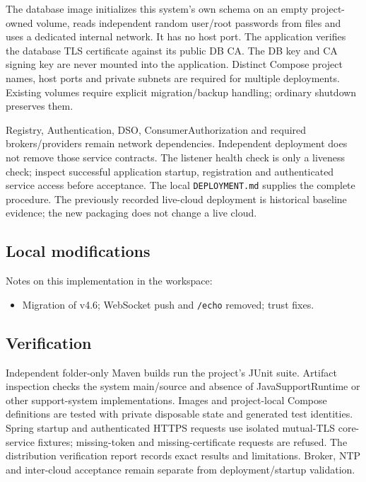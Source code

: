 \documentclass[a4paper]{arrowhead}
\begin{document}
The database image initializes this system's own schema on an empty project-owned volume, reads independent random user/root passwords from files and uses a dedicated internal network. It has no host port. The application verifies the database TLS certificate against its public DB CA. The DB key and CA signing key are never mounted into the application. Distinct Compose project names, host ports and private subnets are required for multiple deployments. Existing volumes require explicit migration/backup handling; ordinary shutdown preserves them.

Registry, Authentication, DSO, ConsumerAuthorization and required brokers/providers remain network dependencies. Independent deployment does not remove those service contracts. The listener health check is only a liveness check; inspect successful application startup, registration and authenticated service access before acceptance. The local \texttt{DEPLOYMENT.md} supplies the complete procedure. The previously recorded live-cloud deployment is historical baseline evidence; the new packaging does not change a live cloud.

\subsection{Local modifications}
\label{sec:local}

Notes on this implementation in the workspace:
\begin{itemize}
  \item Migration of v4.6; WebSocket push and \texttt{/\allowbreak{}echo} removed; trust fixes.
\end{itemize}

\subsection{Verification}

Independent folder-only Maven builds run the project's JUnit suite. Artifact inspection checks the system main/source and absence of JavaSupportRuntime or other support-system implementations. Images and project-local Compose definitions are tested with private disposable state and generated test identities. Spring startup and authenticated HTTPS requests use isolated mutual-TLS core-service fixtures; missing-token and missing-certificate requests are refused. The distribution verification report records exact results and limitations. Broker, NTP and inter-cloud acceptance remain separate from deployment/startup validation.
\end{document}
